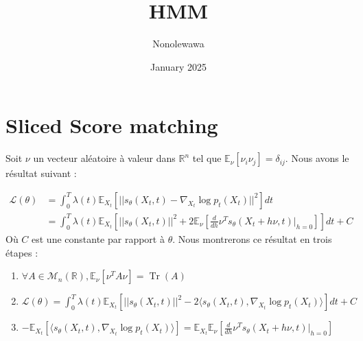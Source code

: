 \documentclass[a4paper, 12pt,french]{report}
\title{HMM}
\author{Nonolewawa }
\date{January 2025}
\DeclareMathOperator{\Tr}{Tr}
\begin{document}
\maketitle

\section{Sliced Score matching}
\noindent
Soit $\nu$ un vecteur aléatoire à valeur dans $\mathbb{R}^n$ tel que $\mathbb{E}_\nu[\nu_i\nu_j]=\delta_{ij}$. Nous avons le résultat suivant : 

\begin{align*}
\mathcal{L}(\theta) & = \int_0^T\lambda(t)\mathbb{E}_{X_t}[||s_\theta(X_t,t)-\nabla_{X_t}\log p_t(X_t)||^2]dt \\
& = \int_0^T\lambda(t)\mathbb{E}_{X_t}[||s_\theta(X_t,t)||^2 + 
2\mathbb{E}_\nu[\frac{d}{dh}\nu^Ts_\theta(X_t+h\nu,t)|_{h=0}]
]dt + C
\end{align*}
Où $C$ est une constante par rapport à $\theta$. Nous montrerons ce résultat en trois étapes  :

\begin{enumerate}
    \item $\forall A \in \mathcal{M}_n(\mathbb{R}), \mathbb{E}_\nu [\nu^TA\nu]=\Tr(A)$
    \item $\mathcal{L}(\theta)=\int_0^T\lambda(t)\mathbb{E}_{X_t}[||s_\theta(X_t,t)||^2 -2 
    \langle s_\theta(X_t,t), \nabla_{X_t}\log p_t(X_t) \rangle
]dt + C$
    \item $-\mathbb{E}_{X_t}[\langle s_\theta(X_t,t), \nabla_{X_t}\log p_t(X_t) \rangle] =
    \mathbb{E}_{X_t}\mathbb{E}_\nu[\frac{d}{dh}\nu^Ts_\theta(X_t+h\nu,t)|_{h=0}]$
\end{enumerate}
\end{document}
